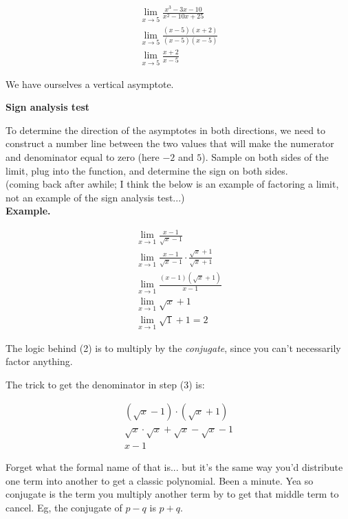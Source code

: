 \documentclass{article}
\begin{document}
\begin{align*}
    \lim_{x \to 5} \frac{x^3 - 3x - 10}{x^2 - 10x + 25}\\
    \lim_{x \to 5} \frac{(x-5)(x+2)}{(x-5)(x-5)}\\
    \lim_{x \to 5} \frac{x+2}{x-5}
\end{align*}

We have ourselves a vertical asymptote.

\textbf{Sign analysis test}

To determine the direction of the asymptotes in both directions, we need to construct a
number line between the two values that will make the numerator and denominator equal to
zero (here $-2$ and $5$). Sample on both sides of the limit, plug into the function, and
determine the sign on both sides.\\

(coming back after awhile; I think the below is an example of factoring a limit, not an
example of the sign analysis test...)\\

\textbf{Example.}

\begin{align}
    \lim_{x \to 1} \frac{x-1}{\sqrt{x} - 1}\\
    \lim_{x \to 1} \frac{x-1}{\sqrt{x} - 1} \cdot \frac{\sqrt{x} + 1}{\sqrt{x} + 1}\\
    \lim_{x \to 1} \frac{(x - 1)(\sqrt{x} + 1)}{x - 1}\\
    \lim_{x \to 1} \sqrt{x} + 1\\
    \lim_{x \to 1} \sqrt{1} + 1 = 2
\end{align}

The logic behind (2) is to multiply by the \emph{conjugate}, since you can't necessarily
factor anything. 

The trick to get the denominator in step (3) is:

\begin{align*}
    (\sqrt{x} - 1) \cdot (\sqrt{x} + 1)\\
    \sqrt{x} \cdot \sqrt{x} + \sqrt{x} - \sqrt{x} - 1\\
    x - 1
\end{align*}

Forget what the formal name of that is... but it's the same way you'd distribute one term
into another to get a classic polynomial. Been a minute. Yea so conjugate is the term you
multiply another term by to get that middle term to cancel. Eg, the conjugate of $p-q$ is
$p+q$.
\end{document}
